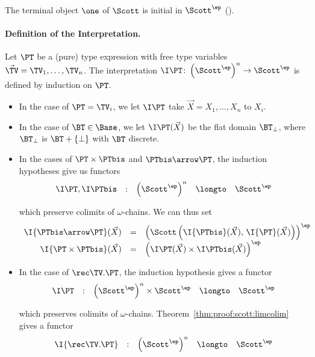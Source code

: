 The terminal object $\one$ of $\Scott$ is initial in $\Scott^\ep$
(\cite[Proposition 7.1.9]{ac98book}).


\paragraph{Definition of the Interpretation.}
Let $\PT$ be a (pure) type expression with free
type variables $\vec \TV = \TV_1,\dots,\TV_n$.
The interpretation $\I\PT \colon \left(\Scott^\ep\right)^n \to \Scott^\ep$
is defined by induction on $\PT$.
\begin{itemize}
\item
In the case of $\PT = \TV_i$,
we let $\I\PT$ take $\vec X = X_1,\dots,X_n$ to $X_i$.

\item
In the case of $\BT \in \Base$,
we let $\I\PT(\vec X)$ be the flat domain $\BT_\bot$,
where $\BT_\bot$ is $\BT + \{\bot\}$ with $\BT$ discrete.


\item
In the cases of $\PT \times \PTbis$
and $\PTbis \arrow \PT$,
the induction hypotheses give us
functors
\[
\begin{array}{*{5}{l}}
  \I\PT, \I\PTbis
& :
& \left( \Scott^\ep \right)^{n}
& \longto
& \Scott^\ep
\end{array}
\]

\noindent
which preserve colimits of $\omega$-chains.
We can thus set
\[
\begin{array}{r c l}
  \I{\PTbis \arrow \PT}(\vec X)
& =
& \left( \Scott \left( \I{\PTbis}(\vec X) ,\, \I{\PT}(\vec X) \right) \right)^\ep
\\

  \I{\PT \times \PTbis}(\vec X)
& =
& \left(
  \I\PT(\vec X) \times \I\PTbis(\vec X)
  \right)^\ep
\end{array}
\]


\item
In the case of $\rec \TV.\PT$,
the induction hypothesis gives a functor
\[
\begin{array}{*{5}{l}}
  \I\PT
& :
& \left( \Scott^\ep \right)^{n} \times \Scott^\ep
& \longto
& \Scott^\ep
\end{array}
\]

\noindent
which preserves colimits of $\omega$-chains.
Theorem~\ref{thm:proof:scott:limcolim}
gives a functor
\[
\begin{array}{l l r c l}
  \I{\rec \TV.\PT}
& :
& \left( \Scott^\ep \right)^{n} 
& \longto
& \Scott^\ep
\\


\end{array}\]
\end{itemize}
